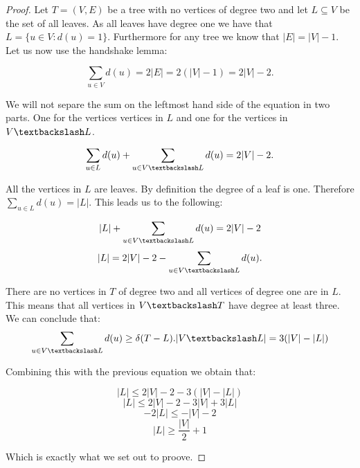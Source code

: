 \begin{appendices}
\begin{proof}
    Let $T = (V, E)$ be a tree with no vertices of degree two and let $L \subseteq V$ be the set of all leaves. As all leaves have degree one we have that $L = \{u \in V: d(u) = 1\}$. Furthermore for any tree we know that $|E| = |V| - 1$. Let us now use the handshake lemma:

    $$ \sum_{u \in V}{d(u)} = 2|E| = 2(|V| - 1) = 2|V| - 2.$$

    We will not separe the sum on the leftmost hand side of the equation in two parts. One for the vertices vertices in $L$ and one for the vertices in $V\textbackslash L$.


    $$ \sum_{u \in L}{d(u)} + \sum_{u \in V\textbackslash L}{d(u)} = 2|V| - 2.$$

    All the vertices in $L$ are leaves. By definition the degree of a leaf is one. Therefore $\sum_{u \in L}{d(u)} = |L|$. This leads us to the following:

    $$  |L| + \sum_{u \in V\textbackslash L}{d(u)} = 2|V| - 2$$
    $$  |L|  = 2|V| - 2 - \sum_{u \in V\textbackslash L}{d(u)}.$$

    There are no vertices in $T$ of degree two and all vertices of degree one are in $L$. This means that all vertices in $V \textbackslash T$ have degree at least three. We can conclude that:
    $$\sum_{u \in V\textbackslash L}{d(u)} \ge \delta(T - L).|V\textbackslash L| = 3(|V| - |L|) $$

    Combining this with the previous equation we obtain that:

    $$  |L| \le 2|V| - 2 - 3(|V| - |L|)$$
    $$  |L| \le 2|V| - 2 - 3|V| + 3|L|$$
    $$  -2|L| \le -|V| - 2$$
    $$  |L| \ge \frac{|V|}{2} + 1$$

    Which is exactly what we set out to proove.



\end{proof}
\end{appendices}
